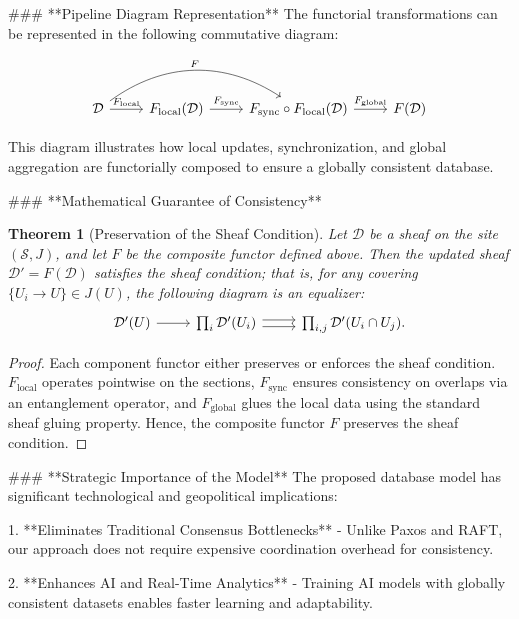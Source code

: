 \documentclass[11pt]{article}
\newtheorem{theorem}[definition]{Theorem}
\theoremstyle{remark}
\begin{document}
### **Pipeline Diagram Representation**
The functorial transformations can be represented in the following commutative diagram:

\[
\begin{tikzcd}
\mathcal{D} \arrow[r,"F_{\text{local}}"] \arrow[rr, bend left=35, "F"] 
& F_{\text{local}}(\mathcal{D}) \arrow[r,"F_{\text{sync}}"] 
& F_{\text{sync}} \circ F_{\text{local}}(\mathcal{D}) \arrow[r,"F_{\text{global}}"] 
& F(\mathcal{D})
\end{tikzcd}
\]

This diagram illustrates how local updates, synchronization, and global aggregation are functorially composed to ensure a globally consistent database.

### **Mathematical Guarantee of Consistency**
\begin{theorem}[Preservation of the Sheaf Condition]
Let \( \mathcal{D} \) be a sheaf on the site \( (\mathcal{S}, J) \), and let \( F \) be the composite functor defined above. Then the updated sheaf \( \mathcal{D}' = F(\mathcal{D}) \) satisfies the sheaf condition; that is, for any covering \( \{ U_i \to U \} \in J(U) \), the following diagram is an equalizer:
\[
\begin{tikzcd}
\mathcal{D}'(U) \arrow[r] & \prod_{i} \mathcal{D}'(U_i) \arrow[r, shift left] \arrow[r, shift right] & \prod_{i,j} \mathcal{D}'(U_i \cap U_j).
\end{tikzcd}
\]
\]
\end{theorem}

\begin{proof}
Each component functor either preserves or enforces the sheaf condition. \( F_{\text{local}} \) operates pointwise on the sections, \( F_{\text{sync}} \) ensures consistency on overlaps via an entanglement operator, and \( F_{\text{global}} \) glues the local data using the standard sheaf gluing property. Hence, the composite functor \( F \) preserves the sheaf condition.
\end{proof}

### **Strategic Importance of the Model**
The proposed database model has significant technological and geopolitical implications:

1. **Eliminates Traditional Consensus Bottlenecks**  
   - Unlike Paxos and RAFT, our approach does not require expensive coordination overhead for consistency.

2. **Enhances AI and Real-Time Analytics**  
   - Training AI models with globally consistent datasets enables faster learning and adaptability.
\end{document}
